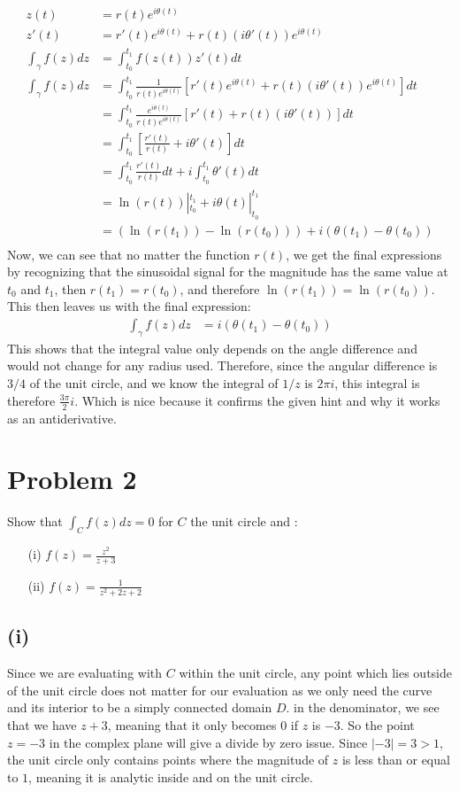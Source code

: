 \documentclass{article}
\begin{document}
\begin{align*}
  z(t) &= r(t)e^{i\theta(t)} \\
  z'(t) &= r'(t)e^{i\theta(t)}+r(t)(i\theta'(t))e^{i\theta(t)}\\
  \int_{\gamma}f(z)dz &= \int_{t_0}^{t_1}f(z(t))z'(t)dt \\
  \int_{\gamma}f(z)dz &= \int_{t_0}^{t_1}\frac{1}{r(t)e^{i\theta(t)}}[r'(t)e^{i\theta(t)}+r(t)(i\theta'(t))e^{i\theta(t)}]dt \\
&= \int_{t_0}^{t_1}\frac{e^{i\theta(t)}}{r(t)e^{i\theta(t)}}[r'(t)+r(t)(i\theta'(t))]dt \\
       &= \int_{t_0}^{t_1}\left[\frac{r'(t)}{r(t)}+i\theta'(t)\right]dt \\
  &= \int_{t_0}^{t_1}\frac{r'(t)}{r(t)}dt +i\int_{t_0}^{t_1} \theta'(t)dt \\
  &= \ln{(r(t))}|_{t_0}^{t_1} +i \theta(t)|_{t_0}^{t_1} \\
  &= (\ln{(r(t_1))} - \ln{(r(t_0))}) + i (\theta(t_1)-\theta(t_0)) \\
\end{align*}
Now, we can see that no matter the function $r(t)$, we get the final expressions by recognizing that the  sinusoidal signal for the magnitude has the same value at $t_0$ and $t_1$, then $r(t_1) = r(t_0)$, and therefore $\ln{(r(t_1))} = \ln{(r(t_0))}$. This then leaves us with the final expression:
\begin{align*}
\int_{\gamma}f(z)dz &=  i (\theta(t_1)-\theta(t_0))
\end{align*}
This shows that the integral value only depends on the angle difference and would not change for any radius used. Therefore, since the angular difference is $3/4$ of the unit circle, and we know the integral of $1/z$ is $2\pi i$, this integral is therefore $\frac{3\pi}{2} i$. Which is nice because it confirms the given hint and why it works as an antiderivative.
\newpage
\section*{Problem 2}
Show that $\int_C f(z)dz = 0$ for $C$ the unit circle and :
\begin{enumerate}
  \item[(i)] $f(z) = \frac{z^2}{z+3}$
  \item[(ii)] $f(z) = \frac{1}{z^2 + 2z + 2}$
\end{enumerate}
\subsection*{(i)}
Since we are evaluating with $C$ within the unit circle, any point which lies outside of the unit circle does not matter for our evaluation as we only need the curve and its interior to be a simply connected domain $D$. in the denominator, we see that we have $z+3$, meaning that it only becomes 0 if $z$ is $-3$. So the point $z = -3$ in the complex plane will give a divide by zero issue. Since $|−3| = 3 > 1$, the unit circle only contains points where the magnitude of $z$ is less than or equal to $1$, meaning it is analytic inside and on the unit circle.
\end{document}
